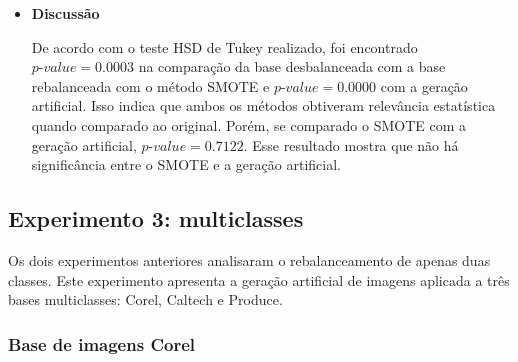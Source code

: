 \begin{itemize}
\item[] \textbf{Discussão}

De acordo com o teste HSD de Tukey realizado, foi encontrado $\textit{p-value} = 0.0003$ na comparação da base desbalanceada com a base rebalanceada com o método SMOTE e $\textit{p-value} = 0.0000$ com a geração artificial. Isso indica que ambos os métodos obtiveram relevância estatística quando comparado ao original. Porém, se comparado o SMOTE com a geração artificial, $\textit{p-value} = 0.7122$. Esse resultado mostra que não há significância entre o SMOTE e a geração artificial.

\end{itemize}

\FloatBarrier
\subsection{Experimento 3: multiclasses}

Os dois experimentos anteriores analisaram o rebalanceamento de apenas duas classes. Este experimento apresenta a geração artificial de imagens aplicada a três bases multiclasses: Corel, Caltech e Produce.

\subsubsection{Base de imagens Corel}

